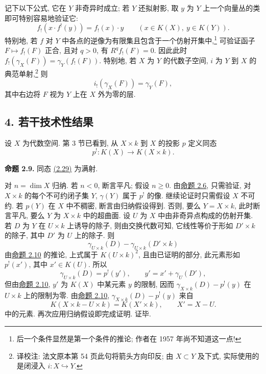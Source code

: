 记下以下公式, 它在 $Y$ 非奇异时成立; 若 $Y$ 还拟射影, 取 $y$ 为 $Y$ 上一个向量丛的类即可特别容易地验证它:
\begin{equation}\tag{2.27}
 f_!(x\cdot f^!(y))=f_!(x)\cdot y\qquad (x\in K(X),\ y\in K(Y)).
\end{equation}
特别地, 若 $f$ 对 $Y$ 中各点的逆像为有限集且包含于一个仿射开集中,\footnote{后一个条件显然是第一个条件的推论; 作者在 1957 年尚不知道这一点!} 可验证函子 $F\mapsto f_!(F)$ 正合, 且对 $q>0$, 有 $R^qf_!(F)=0$. 因此此时 $f_!(\gamma_X(F))=\gamma_Y(f_!(F))$. 特别地, 若 $X$ 为 $Y$ 的代数子空间, $i$ 为 $Y$ 到 $X$ 的典范单射,\footnote{译校注: 法文原本第 54 页此句将箭头方向印反; 由 $X\subset Y$ 及下式, 实际使用的是闭浸入 $i:X\hookrightarrow Y$.} 则
\begin{equation}\tag{2.28}
 i_!(\gamma_X(F))=\gamma_Y(F),
\end{equation}
其中右边将 $F$ 视为 $Y$ 上在 $X$ 外为零的层.

\subsection*{4. 若干技术性结果}

设 $X$ 为代数空间. 第 3 节已看到, 从 $X\times k$ 到 $X$ 的投影 $p$ 定义同态
\begin{equation}\tag{2.29}
 p^!:K(X)\longrightarrow K(X\times k).
\end{equation}

\textbf{命题 2.9.} 同态 \hyperlink{sga6.e00.eq.2-29}{(2.29)} 为满射.

对 $n=\dim X$ 归纳. 若 $n<0$, 断言平凡; 假设 $n\geq 0$. 由\hyperlink{sga6.e00.prop.2-6}{命题 2.6}, 只需验证, 对 $X\times k$ 的每个不可约闭子集 $Y$, $\gamma(Y)$ 属于 $p^!$ 的像. 继续论证时只需假设 $X$ 不可约. 若 $p(Y)$ 在 $X$ 中不稠密, 断言由归纳假设得到. 否则, 要么 $Y=X\times k$, 此时断言平凡, 要么 $Y$ 为 $X\times k$ 中的超曲面. 设 $U$ 为 $X$ 中由非奇异点构成的仿射开集. 若 $D$ 为 $Y$ 在 $U\times k$ 上诱导的除子, 则由交换代数可知, 它线性等价于形如 $D'\times k$ 的除子, 其中 $D'$ 为 $U$ 上的除子. 则
\[
 \gamma_{U\times k}(D)-\gamma_{U\times k}(D'\times k)
\]
由\hyperlink{sga6.e00.prop.2-10}{命题 2.10} 的推论, 上式属于 $K(U\times k)^2$, 且由已证明的部分, 此元素形如 $p^!(x')$, 其中 $x'\in K(U)$. 所以
\[
 \gamma_{U\times k}(D)=p^!(y'),\qquad y'=x'+\gamma_U(D'),
\]
但由\hyperlink{sga6.e00.prop.2-10}{命题 2.10}, $y'$ 为 $K(X)$ 中某元素 $y$ 的限制, 因而 $\gamma_{X\times k}(D)-p^!(y)$ 在 $U\times k$ 上的限制为零. 由\hyperlink{sga6.e00.prop.2-10}{命题 2.10}, $\gamma_{X\times k}(D)-p^!(y)$ 来自
\[
 K(X\times k-U\times k)=K(X'\times k),\qquad X'=X-U.
\]
中的元素. 再次应用归纳假设即完成证明. 证毕.

